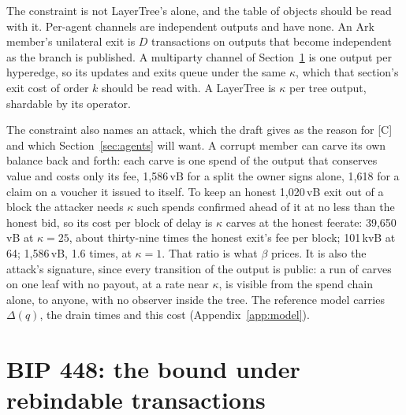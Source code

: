 \documentclass[11pt]{article}
\theoremstyle{plain}
\theoremstyle{definition}
\theoremstyle{remark}
\begin{document}
The constraint is not LayerTree's alone, and the table of objects should be read with it. Per-agent channels are independent outputs and have none. An Ark member's unilateral exit is $D$ transactions on outputs that become independent as the branch is published. A multiparty channel of Section~\ref{sec:bip448} is one output per hyperedge, so its updates and exits queue under the same $\kappa$, which that section's exit cost of order $k$ should be read with. A LayerTree is $\kappa$ per tree output, shardable by its operator.

The constraint also names an attack, which the draft gives as the reason for [C] and which Section~\ref{sec:agents} will want. A corrupt member can carve its own balance back and forth: each carve is one spend of the output that conserves value and costs only its fee, 1{,}586\,vB for a split the owner signs alone, 1{,}618 for a claim on a voucher it issued to itself. To keep an honest 1{,}020\,vB exit out of a block the attacker needs $\kappa$ such spends confirmed ahead of it at no less than the honest bid, so its cost per block of delay is $\kappa$ carves at the honest feerate: 39{,}650\,vB at $\kappa=25$, about thirty-nine times the honest exit's fee per block; 101\,kvB at 64; 1{,}586\,vB, 1.6 times, at $\kappa=1$. That ratio is what $\beta$ prices. It is also the attack's signature, since every transition of the output is public: a run of carves on one leaf with no payout, at a rate near $\kappa$, is visible from the spend chain alone, to anyone, with no observer inside the tree. The reference model carries $\Delta(q)$, the drain times and this cost (Appendix~\ref{app:model}).

\section{BIP 448: the bound under rebindable transactions}
\label{sec:bip448}
\end{document}

